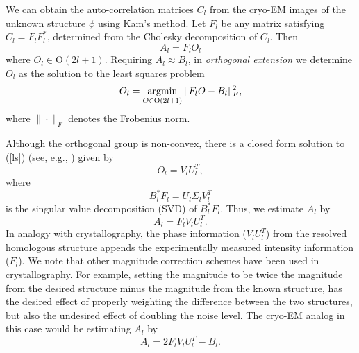 \documentclass{article}
\newcommand{\argmin}{\operatornamewithlimits{argmin}}
\begin{document}
We can obtain the auto-correlation matrices $C_l$ from the cryo-EM images of the
unknown structure $\phi$ using Kam's method.
Let $F_l$ be any matrix satisfying $C_l= F_l F_l^*$, determined from the
Cholesky decomposition of $C_l$. Then 
\begin{equation}
A_l = F_l O_l
\end{equation}
where $O_l \in \text{O}(2l+1)$. Requiring $A_l \approx B_l$, in {\em orthogonal extension} we determine $O_l$ as the solution to the
least squares problem
\begin{equation}\label{ls}
O_l=\argmin_{O \in \text{O}(2l+1)}  \|F_l O - B_l\|_F^2,
\end{equation}
where $\|\cdot\|_F$ denotes the Frobenius norm. 

Although the orthogonal group is non-convex, there is a closed form solution to (\ref{ls}) (see, e.g., \cite{keller}) given by
\begin{equation}
O_l= V_l U_l^T,
\end{equation}
where 
\begin{equation}
B_l^* F_l = U_l \Sigma_l V_l^T
\end{equation}
is the singular value decomposition (SVD) of $B_l^* F_l$. Thus, we estimate $A_l$ by 
\begin{equation}
A_l = F_l V_l U_l^T.
\end{equation} 
In analogy with crystallography, the phase
information ($V_l U_l^T$) from the resolved homologous
structure appends the experimentally measured intensity information ($F_l$). We note that other magnitude correction schemes have been used in crystallography. For example, setting the magnitude to be twice the magnitude from the desired structure minus the magnitude from the known structure, has the desired effect of properly weighting the difference between the two structures, but also the undesired effect of doubling the noise level. The cryo-EM analog in this case would be estimating $A_l$ by 
\begin{equation}
A_l = 2F_l V_l U_l^T - B_l.
\end{equation}
\end{document}
